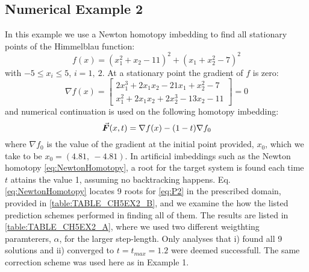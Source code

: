 \subsection{Numerical Example 2}
In this example we use a Newton homotopy imbedding to find all stationary points
of the Himmelblau function:
\begin{equation}
	f(x)=(x_1^2+x_2-11)^2+(x_1+x_2^2-7)^2
	\label{eq:HIMMEL}
\end{equation}
with $-5\leq x_i\leq 5$, $i=1,\ 2$. At a stationary point the gradient of $f$ is
zero:
\begin{equation}
	\nabla f(x) = \begin{bmatrix}
		2x_1^3+2x_1x_2-21x_1+x_2^2-7\\
		x_1^2+2x_1x_2+2x_2^3-13x_2-11
	\end{bmatrix}=0
	\label{eq:P2}
\end{equation}
and numerical continuation is used on the following homotopy imbedding:
\begin{equation}
	\vec{\bm{F}}(x,t) = \nabla f(x)-(1-t)\nabla f_0
	\label{eq:NewtonHomotopy}
\end{equation}
where $\nabla f_0$ is the value of the gradient at the initial point provided,
$x_0$, which we take to be $x_0=(4.81,\ -4.81)$. In artificial imbeddings such
as the Newton homotopy \ref{eq:NewtonHomotopy}, a root for the target system is 
found each time
$t$ attains the value 1, assuming no backtracking happens. Eq. 
\ref{eq:NewtonHomotopy}
locates 9 roots for \ref{eq:P2} in the
prescribed domain, provided in \ref{table:TABLE_CH5EX2_B}, and we examine the 
how the listed prediction schemes performed in finding all of them.  
The results are listed in \ref{table:TABLE_CH5EX2_A}, where we used
two different weigthting paramterers, $\alpha$, for the larger step-length. Only
analyses that i) found all 9 solutions and ii) converged to
$t=t_{max}=1.2$ were deemed successfull. 
The same correction scheme was used here as in Example 1.

